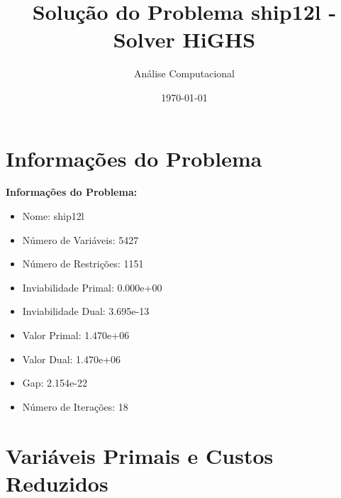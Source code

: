 \documentclass[12pt]{article}
\title{Solução do Problema ship12l - Solver HiGHS}
\author{Análise Computacional}
\date{\today}
\begin{document}
\maketitle

\section{Informações do Problema}

\textbf{Informações do Problema:}
\begin{itemize}
\item Nome: ship12l
\item Número de Variáveis: 5427
\item Número de Restrições: 1151
\item Inviabilidade Primal: 0.000e+00
\item Inviabilidade Dual: 3.695e-13
\item Valor Primal: 1.470e+06
\item Valor Dual: 1.470e+06
\item Gap: 2.154e-22
\item Número de Iterações: 18
\end{itemize}


\section{Variáveis Primais e Custos Reduzidos}
\end{document}
